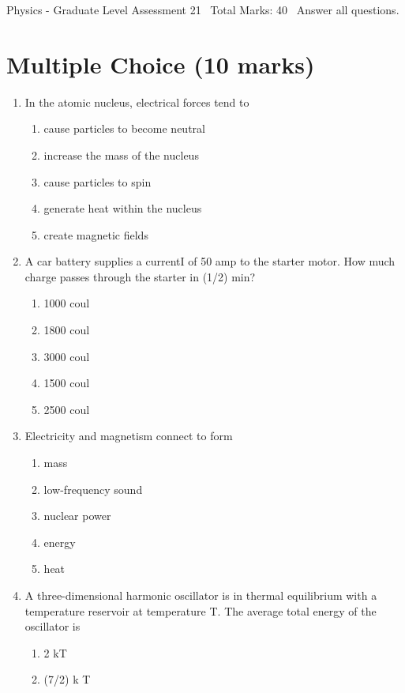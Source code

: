 \documentclass[12pt]{article}
\begin{document}
\begin{center}
Physics - Graduate Level Assessment 21 \
Total Marks: 40 \
Answer all questions.
\end{center}

\section*{Multiple Choice (10 marks)}
\begin{enumerate}[label=\arabic*.]
\item In the atomic nucleus, electrical forces tend to
\begin{enumerate}[label=(\alph*)]
    \item cause particles to become neutral
    \item increase the mass of the nucleus
    \item cause particles to spin
    \item generate heat within the nucleus
    \item create magnetic fields
\end{enumerate}
\item A car battery supplies a currentI of 50 amp to the starter motor. How much charge passes through the starter in (1/2) min?
\begin{enumerate}[label=(\alph*)]
    \item 1000 coul
    \item 1800 coul
    \item 3000 coul
    \item 1500 coul
    \item 2500 coul
\end{enumerate}
\item Electricity and magnetism connect to form
\begin{enumerate}[label=(\alph*)]
    \item mass
    \item low-frequency sound
    \item nuclear power
    \item energy
    \item heat
\end{enumerate}
\item A three-dimensional harmonic oscillator is in thermal equilibrium with a temperature reservoir at temperature T. The average total energy of the oscillator is
\begin{enumerate}[label=(\alph*)]
    \item 2 kT
    \item (7/2) k T

\end{enumerate}
\end{enumerate}
\end{document}
